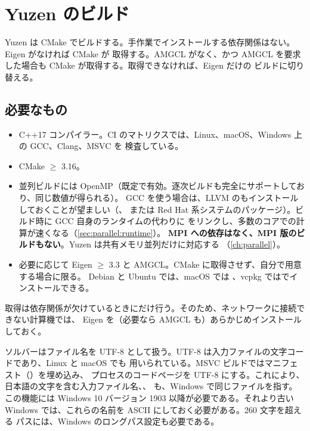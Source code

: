 \chapter{Yuzen のビルド}
\label{ch:installation}

Yuzen は CMake でビルドする。手作業でインストールする依存関係はない。Eigen がなければ CMake が
取得する。AMGCL がなく、かつ AMGCL を要求した場合も CMake が取得する。取得できなければ、Eigen だけの
ビルドに切り替える。

\section{必要なもの}
\label{sec:install:requirements}

\begin{itemize}
  \item C++17 コンパイラー。CI のマトリクスでは、Linux、macOS、Windows 上の GCC、Clang、MSVC を
        検査している。
  \item CMake $\ge$ 3.16。
  \item 並列ビルドには OpenMP（既定で有効。逐次ビルドも完全にサポートしており、同じ数値が得られる）。
        GCC を使う場合は、LLVM のもインストールしておくことが望ましい（、
        または Red Hat 系システムのパッケージ）。ビルド時に GCC 自身のランタイムの代わりに
        をリンクし、多数のコアでの計算が速くなる（\cref{sec:parallel:runtime}）。
        \textbf{MPI への依存はなく、MPI 版のビルドもない}。Yuzen は共有メモリ並列だけに対応する
        （\cref{ch:parallel}）。
  \item 必要に応じて Eigen $\ge$ 3.3 と AMGCL。CMake に取得させず、自分で用意する場合に限る。
        Debian と Ubuntu では、macOS では
        、vcpkg ではでインストールできる。
\end{itemize}

取得は依存関係が欠けているときにだけ行う。そのため、ネットワークに接続できない計算機では、
Eigen を（必要なら AMGCL も）あらかじめインストールしておく。

\begin{note}
  ソルバーはファイル名を UTF-8 として扱う。UTF-8 は入力ファイルの文字コードであり、Linux と macOS でも
  用いられている。MSVC ビルドではマニフェスト（）を埋め込み、
  プロセスのコードページを UTF-8 にする。これにより、日本語の文字を含む入力ファイル名、、
  も、Windows で同じファイルを指す。この機能には Windows 10 バージョン 1903
  以降が必要である。それより古い Windows では、これらの名前を ASCII にしておく必要がある。260 文字を超える
  パスには、Windows のロングパス設定も必要である。
\end{note}

